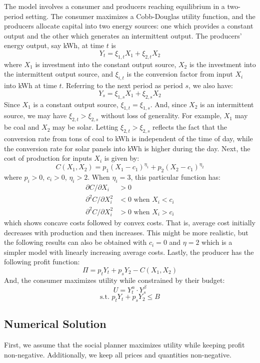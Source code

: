 \documentclass[12pt,a4paper]{extarticle}
\begin{document}
The model involves a consumer and producers reaching equilibrium in a two-period setting. The consumer maximizes a Cobb-Douglas utility function, and the producers allocate capital into two energy sources: one which provides a constant output and the other which generates an intermittent output. 
The producers' energy output, say kWh, at time $t$ is 
$$Y_t = \xi_{1,t} X_1 + \xi_{2,t} X_2$$
where $X_1$ is investment into the constant output source, $X_2$ is the investment into the intermittent output source, and $\xi_{i,t}$ is the conversion factor from input $X_i$ into kWh at time $t$. Referring to the next period as period $s$, we also have:
$$Y_s = \xi_{1,s} X_1 + \xi_{2,s} X_2$$
Since $X_1$ is a constant output source, $\xi_{1,t} = \xi_{1,s}$. And, since $X_2$ is an intermittent source, we may have $\xi_{2,t} > \xi_{2,s}$ without loss of generality. For example, $X_1$ may be coal and $X_2$ may be solar. Letting $\xi_{2,t} > \xi_{2,s}$  reflects the fact that the conversion rate from tons of coal to kWh is independent of the time of day, while the conversion rate for solar panels into kWh is higher during the day. 
Next, the cost of production for inputs $X_i$ is given by:
$$C(X_1, X_2) = p_1 (X_1 - c_1)^{\eta_1} + p_2 (X_2 - c_1)^{\eta_2}$$
where $p_i > 0$, $c_i > 0$, $\eta_i > 2$. When $\eta_i = 3$, this particular function has:
\begin{align*}
\partial C / \partial X_i &> 0 \\
\partial^2 C / \partial X_i^2 &< 0 \text{ when } X_i < c_i \\
\partial^2 C / \partial X_i^2 &> 0 \text{ when } X_i > c_i
\end{align*}
which shows concave costs followed by convex costs. That is, average cost initially decreases with production and then increases. This might be more realistic, but the following results can also be obtained with $c_i = 0$ and $\eta = 2$ which is a simpler model with linearly increasing average costs. 
Lastly, the producer has the following profit function:
$$\Pi = p_t Y_t + p_s Y_2 - C(X_1, X_2)$$
And, the consumer maximizes utility while constrained by their budget:
$$U = Y_t^\alpha \cdot Y_s^\beta$$
$$\text{s.t. }  p_t Y_t + p_s Y_2 \leq B$$




\subsection{Numerical Solution}

First, we assume that the social planner maximizes utility while keeping profit non-negative. Additionally, we keep all prices and quantities non-negative. 
\end{document}
